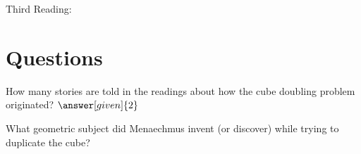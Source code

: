 \documentclass{ximera}
\begin{document}

Third Reading: 


\section{Questions}

\begin{question}
How many stories are told in the readings about how the cube doubling problem originated?  $\answer[given]{2}$
\end{question}



\begin{question}
What geometric subject did Menaechmus invent (or discover) while trying to duplicate the cube?
\begin{multipleChoice}
\end{multipleChoice}
\end{question}


\end{document}
